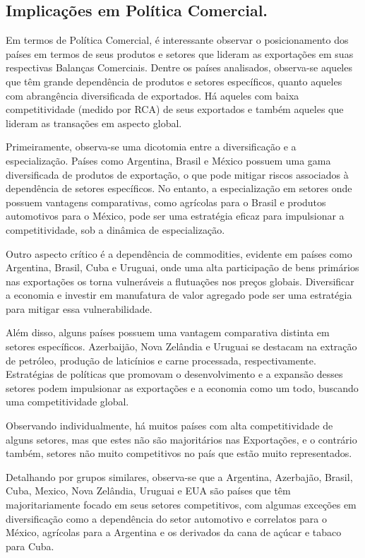 \subsection{Implicações em Política Comercial.}


Em termos de Política Comercial, é interessante observar o posicionamento dos países em termos de seus produtos e setores que lideram as exportações em suas respectivas Balanças Comerciais. Dentre os países analisados, observa-se aqueles que têm grande dependência de produtos e setores específicos, quanto aqueles com abrangência diversificada de exportados. Há aqueles com baixa competitividade (medido por RCA) de seus exportados e também aqueles que lideram as transações em aspecto global.

Primeiramente, observa-se uma dicotomia entre a diversificação e a especialização. Países como Argentina, Brasil e México possuem uma gama diversificada de produtos de exportação, o que pode mitigar riscos associados à dependência de setores específicos. No entanto, a especialização em setores onde possuem vantagens comparativas, como agrícolas para o Brasil e produtos automotivos para o México, pode ser uma estratégia eficaz para impulsionar a competitividade, sob a dinâmica de especialização.

Outro aspecto crítico é a dependência de commodities, evidente em países como Argentina, Brasil, Cuba e Uruguai, onde uma alta participação de bens primários nas exportações os torna vulneráveis a flutuações nos preços globais. Diversificar a economia e investir em manufatura de valor agregado pode ser uma estratégia para mitigar essa vulnerabilidade.

Além disso, alguns países possuem uma vantagem comparativa distinta em setores específicos. Azerbaijão, Nova Zelândia e Uruguai se destacam na extração de petróleo, produção de laticínios e carne processada, respectivamente. Estratégias de políticas que promovam o desenvolvimento e a expansão desses setores podem impulsionar as exportações e a economia como um todo, buscando uma competitividade global.

Observando individualmente, há muitos países com alta competitividade de alguns setores, mas que estes não são majoritários nas Exportações, e o contrário também, setores não muito competitivos no país que estão muito representados.

Detalhando por grupos similares, observa-se que a Argentina, Azerbajão, Brasil, Cuba, Mexico, Nova Zelândia, Uruguai e EUA são países que têm majoritariamente focado em seus setores competitivos, com algumas exceções em diversificação como a dependência do setor automotivo e correlatos para o México, agrícolas para a Argentina e os derivados da cana de açúcar e tabaco para Cuba.

